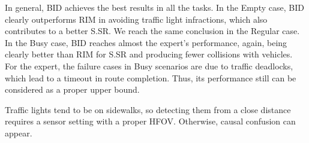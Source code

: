 In general, BID achieves the best results in all the tasks. 
In the Empty case, BID clearly outperforms RIM in avoiding traffic light infractions, which also contributes to a better S.SR. 
We reach the same conclusion in the Regular case. 
In the Busy case, BID reaches almost the expert's performance, again, being clearly better than RIM for S.SR and producing fewer collisions with vehicles. 
For the expert, the failure cases in Busy scenarios are due to traffic deadlocks, which lead to a timeout in route completion. 
Thus, its performance still can be considered as a proper upper bound. 


Traffic lights tend to be on sidewalks, so detecting them from a close distance requires a sensor setting with a proper HFOV. 
Otherwise, causal confusion can appear. 


